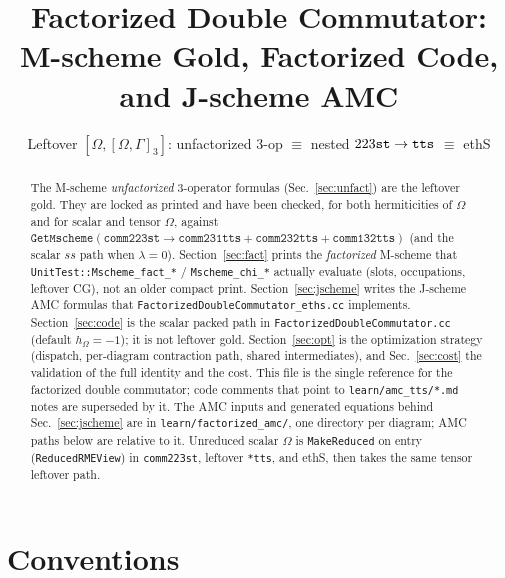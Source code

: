 \documentclass[enabledeprecatedfontcommands]{scrartcl}
\newcommand{\codename}[1]{\texttt{#1}}
\begin{document}
\title{Factorized Double Commutator:\\
M-scheme Gold, Factorized Code, and J-scheme AMC}
\subtitle{Leftover $[\Omega,[\Omega,\Gamma]_3]$:
unfactorized 3-op $\equiv$ nested $223{\tt st}\to{\tt tts}$ $\equiv$ ethS}
\date{}
\maketitle

\begin{abstract}
\noindent
The M-scheme \emph{unfactorized} 3-operator formulas
(Sec.~\ref{sec:unfact}) are the leftover gold.
They are locked as printed and have been checked, for both hermiticities of
$\Omega$ and for scalar and tensor $\Omega$, against
$\mathtt{GetMscheme}(\mathtt{comm223st}\to\mathtt{comm231tts}
+\mathtt{comm232tts}+\mathtt{comm132tts})$
(and the scalar $ss$ path when $\lambda=0$).
Section~\ref{sec:fact} prints the \emph{factorized} M-scheme that
\codename{UnitTest::Mscheme\_fact\_*} / \codename{Mscheme\_chi\_*} actually
evaluate (slots, occupations, leftover CG), not an older compact print.
Section~\ref{sec:jscheme} writes the J-scheme AMC formulas that
\codename{FactorizedDoubleCommutator\_eths.cc} implements.
Section~\ref{sec:code} is the scalar packed path in
\codename{FactorizedDoubleCommutator.cc} (default $h_\Omega=-1$);
it is not leftover gold.
Section~\ref{sec:opt} is the optimization strategy (dispatch, per-diagram
contraction path, shared intermediates), and Sec.~\ref{sec:cost} the
validation of the full identity and the cost.
This file is the single reference for the factorized double commutator;
code comments that point to \codename{learn/amc\_tts/*.md} notes are
superseded by it. The AMC inputs and generated equations behind
Sec.~\ref{sec:jscheme} are in \codename{learn/factorized\_amc/}, one
directory per diagram; AMC paths below are relative to it.
Unreduced scalar $\Omega$ is \codename{MakeReduced} on entry
(\codename{ReducedRMEView}) in \codename{comm223st}, leftover
\codename{*tts}, and ethS, then takes the same tensor leftover path.
\end{abstract}

\tableofcontents

\section{Conventions}
\label{sec:conv}
\end{document}
